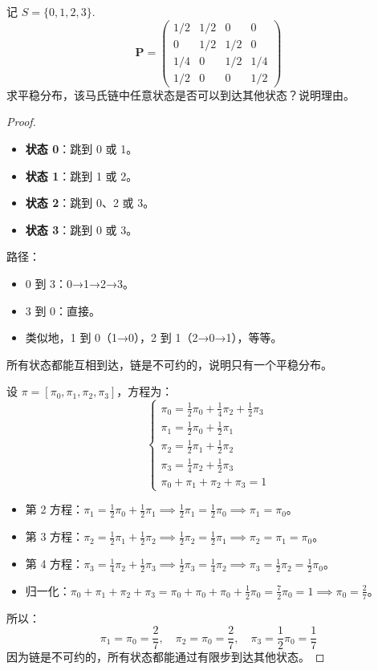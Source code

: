 \documentclass[lang=cn,10pt,thmcnt=section]{elegantbook}
\begin{document}
\begin{example}
	记 $S = \{0, 1, 2, 3\}$.
    \[
    \mathbf{P} = \begin{pmatrix}
    1/2 & 1/2 & 0 & 0 \\
    0 & 1/2 & 1/2 & 0 \\
    1/4 & 0 & 1/2 & 1/4 \\
    1/2 & 0 & 0 & 1/2
    \end{pmatrix}
    \]
    求平稳分布，该马氏链中任意状态是否可以到达其他状态？说明理由。
    
\end{example}
\begin{proof}
	\begin{itemize}
		\item \textbf{状态 0}：跳到 0 或 1。
		\item \textbf{状态 1}：跳到 1 或 2。
		\item \textbf{状态 2}：跳到 0、2 或 3。
		\item \textbf{状态 3}：跳到 0 或 3。
	\end{itemize}
	路径：
	\begin{itemize}
		\item 0 到 3：0→1→2→3。
		\item 3 到 0：直接。
		\item 类似地，1 到 0（1→0），2 到 1（2→0→1），等等。
	\end{itemize}
	所有状态都能互相到达，链是不可约的，说明只有一个平稳分布。

	设 \(\pi = [\pi_0, \pi_1, \pi_2, \pi_3]\)，方程为：
\[
\begin{cases}
\pi_0 = \frac{1}{2}\pi_0 + \frac{1}{4}\pi_2 + \frac{1}{2}\pi_3 \\
\pi_1 = \frac{1}{2}\pi_0 + \frac{1}{2}\pi_1 \\
\pi_2 = \frac{1}{2}\pi_1 + \frac{1}{2}\pi_2 \\
\pi_3 = \frac{1}{4}\pi_2 + \frac{1}{2}\pi_3 \\
\pi_0 + \pi_1 + \pi_2 + \pi_3 = 1
\end{cases}
\]

\begin{itemize}
    \item 第 2 方程：\(\pi_1 = \frac{1}{2}\pi_0 + \frac{1}{2}\pi_1 \implies \frac{1}{2}\pi_1 = \frac{1}{2}\pi_0 \implies \pi_1 = \pi_0\)。
    \item 第 3 方程：\(\pi_2 = \frac{1}{2}\pi_1 + \frac{1}{2}\pi_2 \implies \frac{1}{2}\pi_2 = \frac{1}{2}\pi_1 \implies \pi_2 = \pi_1 = \pi_0\)。
    \item 第 4 方程：\(\pi_3 = \frac{1}{4}\pi_2 + \frac{1}{2}\pi_3 \implies \frac{1}{2}\pi_3 = \frac{1}{4}\pi_2 \implies \pi_3 = \frac{1}{2}\pi_2 = \frac{1}{2}\pi_0\)。
    \item 归一化：\(\pi_0 + \pi_1 + \pi_2 + \pi_3 = \pi_0 + \pi_0 + \pi_0 + \frac{1}{2}\pi_0 = \frac{7}{2}\pi_0 = 1 \implies \pi_0 = \frac{2}{7}\)。
\end{itemize}
所以：
\[
\pi_1 = \pi_0 = \frac{2}{7}, \quad \pi_2 = \pi_0 = \frac{2}{7}, \quad \pi_3 = \frac{1}{2}\pi_0 = \frac{1}{7}
\]
因为链是不可约的，所有状态都能通过有限步到达其他状态。
\end{proof}
\end{document}
